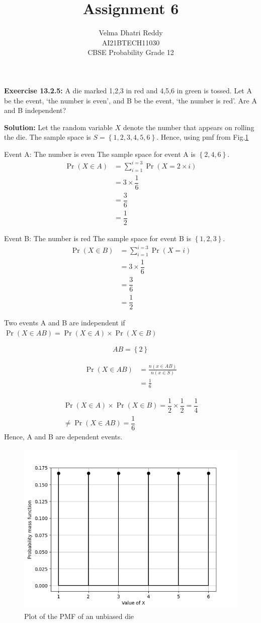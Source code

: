\documentclass[journal,11pt,twocolumn]{IEEEtran}
\title{Assignment 6}
\author{Velma Dhatri Reddy \\ \normalsize AI21BTECH11030 \\ \vspace*{10pt} \Large CBSE Probability Grade 12}
\providecommand{\pr}[1]{\ensuremath{\Pr\left(#1\right)}}
\providecommand{\cbrak}[1]{\ensuremath{\left\{#1\right\}}}
\providecommand{\brak}[1]{\ensuremath{\left(#1\right)}}
\begin{document}
\maketitle
\textbf{Exeercise 13.2.5:}
A die marked 1,2,3 in red and 4,5,6 in green is tossed. Let A be the event, ‘the number is even’, and B be the event, ‘the number is red’. Are A and B independent?

\textbf{Solution:} Let the random variable $X$ denote the number that appears on rolling the die. The sample space is $S = \cbrak{1, 2, 3, 4, 5, 6}$.
Hence, using pmf from Fig.\ref{fig:pmf}

Event A: The number is even
The sample space for event A is \cbrak{2,4,6}.
\begin{align}
    \pr{X \in A}&= \sum_{i = 1}^{i = 3}\pr{X = 2\times i}\\
    &= 3\times \dfrac{1}{6}\\
    &= \dfrac{3}{6}\\
    &= \dfrac{1}{2}
\end{align}

Event B: The number is red
The sample space for event B is \cbrak{1,2,3}.
\begin{align}
    \pr{X \in B}&= \sum_{i = 1}^{i = 3}\pr{X = i}\\
    &= 3\times \dfrac{1}{6}\\
    &= \dfrac{3}{6}\\
    &= \dfrac{1}{2}
\end{align}

Two events A and B are independent if 
$\pr{X \in AB } = \pr{X \in A}\times\pr{X \in B}$

\begin{align}
    AB = \cbrak{2}
\end{align}
    
\begin{align}
    \pr{X \in AB} &= \frac{n\brak{x \in AB}}{n\brak{x \in S}}\\
    &= \frac{1}{6}
\end{align}

\begin{multline}
    \pr{X \in A}\times\pr{X \in B} = \dfrac{1}{2}\times\dfrac{1}{2} = \dfrac{1}{4}\\
    \neq \pr{X \in AB } = \dfrac{1}{6}
\end{multline}
Hence, A and B are dependent events.

\begin{figure}[!ht]
\centering
\includegraphics[width=\columnwidth]{figs/pmf.png}
\caption{Plot of the PMF of an unbiased die}
\label{fig:pmf}
\end{figure}
\end{document}
